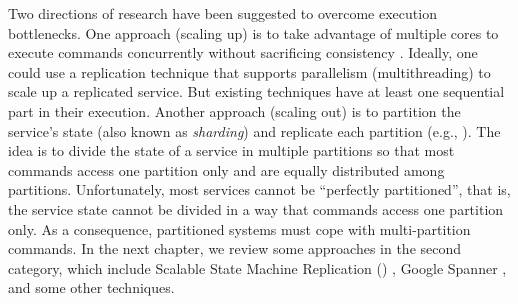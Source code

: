 Two directions of research have been suggested to overcome execution
bottlenecks. One approach (scaling up) is to take advantage of multiple cores to
execute commands concurrently without sacrificing consistency
\cite{Kapritsos:2012um,Marandi:2014bj,Kotla:2004ep,Guo:2014jp}. Ideally, one
could use a replication technique that supports parallelism (multithreading) to
scale up a replicated service. But existing techniques have at least one
sequential part in their execution. Another approach (scaling out) is to
partition the service's state (also known as \emph{sharding}) and replicate each
partition (e.g., \cite{Glendenning:2011kj,Marandi:2011dj}). The idea is to
divide the state of a service in multiple partitions so that most commands
access one partition only and are equally distributed among partitions.
Unfortunately, most services cannot be “perfectly partitioned”, that is, the
service state cannot be divided in a way that commands access one partition
only. As a consequence, partitioned systems must cope with multi-partition
commands. In the next chapter, we review some approaches in the second category,
which include Scalable State Machine Replication (\ssmr) \cite{bezerra2014ssmr},
Google Spanner \cite{corbett2013spanner}, and some other techniques.
